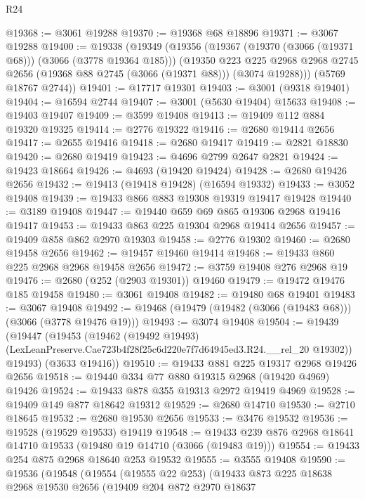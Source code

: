 \begin{lexlean}{R24}
\begin{coremodule}
@19368 := @3061 @19288
@19370 := @19368 @68 @18896
@19371 := @3067 @19288
@19400 := @19338
    (@19349
      (@19356
        (@19367 (@19370 (@3066 (@19371 @68))) (@3066 (@3778 @19364 @185)))
        (@19350
          @223
          @225
          @2968
          @2968
          @2745
          @2656
          (@19368 @88 @2745 (@3066 (@19371 @88)))
          (@3074 @19288)))
      (@5769 @18767 @2744))
@19401 := @17717 @19301
@19403 := @3001 (@9318 @19401)
@19404 := @16594 @2744
@19407 := @3001 (@5630 @19404) @15633
@19408 := @19403 @19407
@19409 := @3599 @19408
@19413 := @19409 @112 @884 @19320 @19325
@19414 := @2776 @19322
@19416 := @2680 @19414 @2656
@19417 := @2655 @19416
@19418 := @2680 @19417
@19419 := @2821 @18830
@19420 := @2680 @19419
@19423 := @4696 @2799 @2647 @2821
@19424 := @19423 @18664
@19426 := @4693 (@19420 @19424)
@19428 := @2680 @19426 @2656
@19432 := @19413 (@19418 @19428) (@16594 @19332)
@19433 := @3052 @19408
@19439 := @19433 @866 @883 @19308 @19319 @19417 @19428
@19440 := @3189 @19408
@19447 := @19440 @659 @69 @865 @19306 @2968 @19416 @19417
@19453 := @19433 @863 @225 @19304 @2968 @19414 @2656
@19457 := @19409 @858 @862 @2970 @19303
@19458 := @2776 @19302
@19460 := @2680 @19458 @2656
@19462 := @19457 @19460 @19414
@19468 := @19433 @860 @225 @2968 @2968 @19458 @2656
@19472 := @3759 @19408 @276 @2968 @19
@19476 := @2680 (@252 (@2903 @19301)) @19460
@19479 := @19472 @19476 @185 @19458
@19480 := @3061 @19408
@19482 := @19480 @68 @19401
@19483 := @3067 @19408
@19492 := @19468 (@19479 (@19482 (@3066 (@19483 @68))) (@3066 (@3778 @19476 @19)))
@19493 := @3074 @19408
@19504 := @19439
    (@19447
      (@19453
        (@19462
          (@19492 @19493)
          (LexLeanPreserve.Cae723b4f28f25c6d220e7f7d64945ed3.R24.__rel_20 @19302))
        @19493)
      (@3633 @19416))
@19510 := @19433 @881 @225 @19317 @2968 @19426 @2656
@19518 := @19440 @334 @77 @880 @19315 @2968 (@19420 @4969) @19426
@19524 := @19433 @878 @355 @19313 @2972 @19419 @4969
@19528 := @19409 @149 @877 @18642 @19312
@19529 := @2680 @14710
@19530 := @2710 @18645
@19532 := @2680 @19530 @2656
@19533 := @3476 @19532
@19536 := @19528 (@19529 @19533) @19419
@19548 := @19433 @239 @876 @2968 @18641 @14710 @19533 (@19480 @19 @14710 (@3066 (@19483 @19)))
@19554 := @19433 @254 @875 @2968 @18640 @253 @19532
@19555 := @3555 @19408
@19590 := @19536
    (@19548
      (@19554
        (@19555 @22 @253)
        (@19433
          @873
          @225
          @18638
          @2968
          @19530
          @2656
          (@19409
            @204
            @872
            @2970
            @18637

\end{coremodule}
\end{lexlean}
